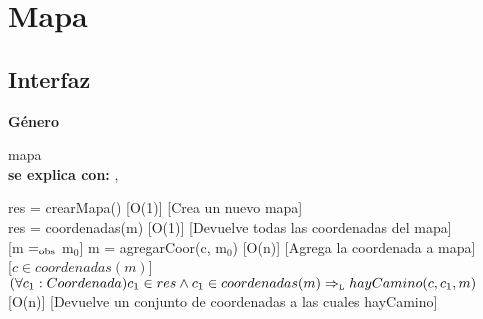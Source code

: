 \section{Mapa}


\subsection{Interfaz}

\parbox {1,7cm}{{\bf Género}} mapa\\
{\bf se explica con:}  , \\
\medskip

{res = crearMapa()}
[O(1)]
[Crea un nuevo mapa]
\\

{res = coordenadas(m)}
[O(1)]
[Devuelve todas las coordenadas del mapa]
\\

[m $=_{\mathrm{obs}}$ m$_0$]
{m = agregarCoor(c, m$_0$)}
[O(n)]
[Agrega la coordenada a mapa]
\\


[$c \in coordenadas(m)$]
{$(\forall c_1: Coordenada) c_1 \in res \wedge c_1 \in coordenadas(m) \Rightarrow_{\mathrm{\scriptscriptstyle{L}}} hayCamino(c, c_1, m)$}
[O(n)]
[Devuelve un conjunto de coordenadas a las cuales hayCamino]
\\


